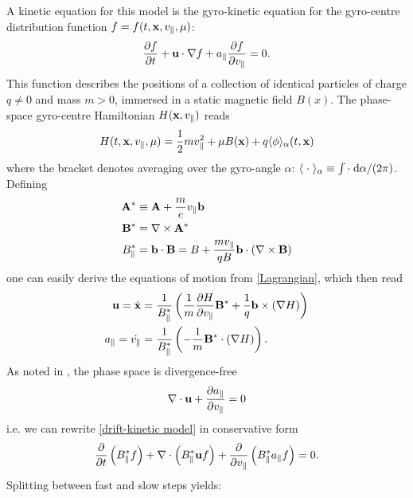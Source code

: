 A kinetic equation for this model is the gyro-kinetic equation for the gyro-centre distribution function $f=f(t,\mathbf{x}, v_\parallel, \mu)$:
\begin{equation}\label{drift-kinetic model}
	\frac{\partial f}{\partial t} + \mathbf{u} \cdot \nabla f + a_\parallel \frac{\partial f}{\partial v_\parallel} = 0.
\end{equation}
This function describes the positions of a collection of identical particles of charge $q\neq0$ and mass $m>0$, immersed in a static magnetic field $B(x)$.
The phase-space gyro-centre Hamiltonian $H(\mathbf{x}, v_\parallel)$ reads
\begin{equation}
	H(t, \mathbf{x}, v_\parallel, \mu) = \frac{1}{2} m v_\parallel^2 + \mu B(\mathbf{x}) + q \langle \phi \rangle_\alpha (t,\mathbf{x})
\end{equation}
where the bracket denotes averaging over the gyro-angle $\alpha$: $\langle \;\cdot\; \rangle_\alpha \equiv \int \cdot\;\text{d} \alpha / (2\pi)$.\\
Defining
\begin{subequations}
	\begin{align}
		\mathbf{A}^\ast & \equiv \mathbf{A} + \frac{m}{e} v_\parallel \mathbf{b} \\
		\mathbf{B}^\ast & = \nabla \times \mathbf{A}^\ast \\
		B_\parallel^\ast & = \mathbf{b} \cdot \mathbf{B} = B + \frac{m v_\parallel}{q B} \mathbf{b} \cdot \left( \nabla \times \mathbf{B} \right)
	\end{align}
\end{subequations}
one can easily derive the equations of motion from \eqref{Lagrangian}, which then read
\begin{subequations}
	\begin{align}
		\mathbf{u} = \dot{\mathbf{x}} & = \frac{1}{B_\parallel^\ast} \left( \frac{1}{m} \frac{\partial H}{\partial v_\parallel} \mathbf{B}^\ast + \frac{1}{q} \mathbf{b} \times \left(\nabla H\right) \right) \label{eom for bu} \\
		a_\parallel = \dot{v_\parallel} & = \frac{1}{B_\parallel^\ast} \left( -\frac{1}{m} \mathbf{B}^\ast \cdot \left( \nabla H \right) \right). \label{eom for ap}
	\end{align}
\end{subequations}
As noted in \cite{Latu_2017}, the phase space is divergence-free
\begin{equation}
	\nabla \cdot \mathbf{u} + \frac{\partial a_\parallel}{\partial v_\parallel} = 0
\end{equation}
i.e. we can rewrite \eqref{drift-kinetic model} in conservative form
\begin{equation}\label{conservation1}
	\frac{\partial }{\partial t}\left(B_\parallel^\ast f\right) + \nabla\cdot\left( B_\parallel^\ast \mathbf{u} f \right) + \frac{\partial }{\partial v_\parallel} \left( B_\parallel^\ast a_\parallel f \right) = 0.
\end{equation}
Splitting between fast and slow steps yields:

